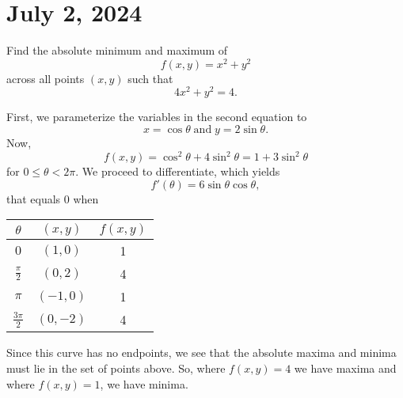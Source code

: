 \chapter{July 2, 2024}

\begin{example}
    Find the absolute minimum and maximum of
    \[f(x, y) = x^{2} + y^{2}\]
    across all points $(x, y)$ such that
    \[4x^{2} + y^{2} = 4.\]

    \begin{soln}
        First, we parameterize the variables in the second equation to
        \[x = \cos\theta \; \text{and} \; y = 2\sin\theta.\]
        Now,
        \[f(x, y) = \cos^{2}\theta + 4\sin^{2}\theta = 1 + 3\sin^{2}\theta\]
        for $0 \leq \theta < 2\pi$. We proceed to differentiate, which yields
        \[f'(\theta) = 6\sin\theta\cos\theta,\]
        that equals 0 when

        {\centering
        \begin{tabular}{c|c|c}
            $\theta$ & $(x, y)$ & $f(x, y)$ \\
            \hline
            $0$ & $(1, 0)$ & 1 \\
            $\frac{\pi}{2}$ & $(0, 2)$ & 4 \\
            $\pi$ & $(-1, 0)$ & 1 \\
            $\frac{3\pi}{2}$ & $(0, -2)$ & 4 \\
        \end{tabular}
        \par}

        Since this curve has no endpoints, we see that the absolute maxima and minima must lie in the set of points above. So, where $f(x, y) = 4$ we have maxima and where $f(x, y) = 1$, we have minima.
    \end{soln}
\end{example}